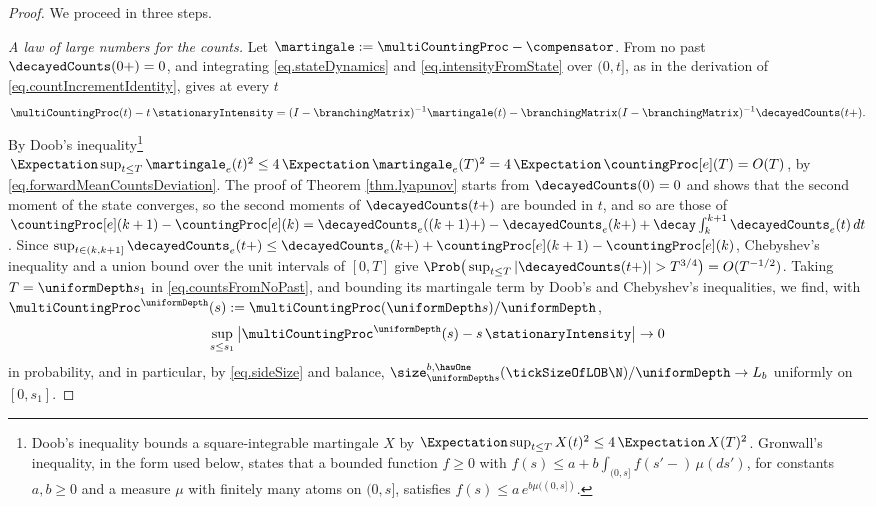 \begin{proof}
 We proceed in three steps.

 \emph{A law of large numbers for the counts.}
 Let $\martingale := \multiCountingProc - \compensator$.
 From no past $\decayedCounts(0+) = 0$,
 and integrating \eqref{eq.stateDynamics} and \eqref{eq.intensityFromState} over $(0, t]$,
 as in the derivation of \eqref{eq.countIncrementIdentity},
 gives at every $t$
 \begin{equation}\label{eq.countsFromNoPast}
  \multiCountingProc(t) - t\,\stationaryIntensity
  = (I - \branchingMatrix)^{-1} \martingale(t)
  - \branchingMatrix (I - \branchingMatrix)^{-1} \decayedCounts(t+) .
 \end{equation}
 By Doob's inequality\footnote{%
  Doob's inequality bounds a square-integrable martingale $X$ by
  $\Expectation \sup_{t \leq T} X(t)^{2} \leq 4\,\Expectation\,X(T)^{2}$.
  Gronwall's inequality, in the form used below,
  states that a bounded function $f \geq 0$ with
  $f(s) \leq a + b \int_{(0,s]} f(s'-) \, \mu(ds')$,
  for constants $a, b \geq 0$ and a measure $\mu$ with finitely many atoms on $(0,s]$,
  satisfies $f(s) \leq a \, e^{b \mu((0,s])}$.}
 $\Expectation \sup_{t \leq T} \martingale_e(t)^{2}
 \leq 4\,\Expectation\,\martingale_e(T)^{2} = 4\,\Expectation\,\countingProc[e](T) = O(T)$,
 by \eqref{eq.forwardMeanCountsDeviation}.
 The proof of Theorem \ref{thm.lyapunov} starts from $\decayedCounts(0) = 0$
 and shows that the second moment of the state converges,
 so the second moments of $\decayedCounts(t+)$ are bounded in $t$,
 and so are those of
 $\countingProc[e](k+1) - \countingProc[e](k)
 = \decayedCounts_e((k+1)+) - \decayedCounts_e(k+)
 + \decay \int_{k}^{k+1} \decayedCounts_e(t) \, dt$.
 Since
 $\sup_{t \in (k, k+1]} \decayedCounts_e(t+)
 \leq \decayedCounts_e(k+) + \countingProc[e](k+1) - \countingProc[e](k)$,
 Chebyshev's inequality and a union bound over the unit intervals of $[0, T]$ give
 $\Prob\big( \sup_{t \leq T} \vert \decayedCounts(t+) \vert > T^{3/4} \big)
 = O(T^{-1/2})$.
 Taking $T = \uniformDepth s_1$ in \eqref{eq.countsFromNoPast},
 and bounding its martingale term by Doob's and Chebyshev's inequalities,
 we find, with
 $\multiCountingProc^{\uniformDepth}(s) := \multiCountingProc(\uniformDepth s)/\uniformDepth$,
 \begin{equation*}
  \sup_{s \leq s_1} \big\vert
  \multiCountingProc^{\uniformDepth}(s) - s\,\stationaryIntensity
  \big\vert \to 0
 \end{equation*}
 in probability,
 and in particular, by \eqref{eq.sideSize} and balance,
 $\size^{b,\hawOne}_{\uniformDepth s}(\tickSizeOfLOB\N) / \uniformDepth \to L_b$
 uniformly on $[0, s_1]$.


\end{proof}
